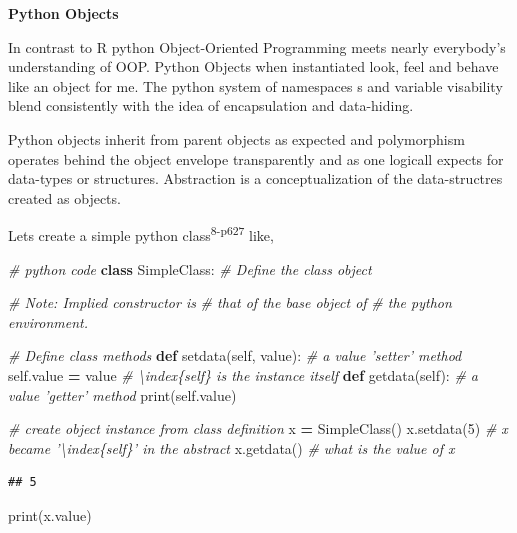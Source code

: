 \documentclass[]{book}
\newenvironment{Shaded}{\begin{snugshade}}{\end{snugshade}}
\newcommand{\KeywordTok}[1]{\textcolor[rgb]{0.13,0.29,0.53}{\textbf{#1}}}
\newcommand{\DecValTok}[1]{\textcolor[rgb]{0.00,0.00,0.81}{#1}}
\newcommand{\CommentTok}[1]{\textcolor[rgb]{0.56,0.35,0.01}{\textit{#1}}}
\newcommand{\VariableTok}[1]{\textcolor[rgb]{0.00,0.00,0.00}{#1}}
\newcommand{\OperatorTok}[1]{\textcolor[rgb]{0.81,0.36,0.00}{\textbf{#1}}}
\newcommand{\BuiltInTok}[1]{#1}
\newcommand{\NormalTok}[1]{#1}
\theoremstyle{definition}
\theoremstyle{definition}
\theoremstyle{definition}
\theoremstyle{remark}
\begin{document}
\textbf{Python Objects}

In contrast to R python Object-Oriented Programming meets nearly
everybody's understanding of OOP. Python Objects 
when instantiated look, feel and behave like an object for me. The
python system of namespaces s and variable visability
blend consistently with the idea of encapsulation and data-hiding.

Python objects inherit from parent objects as expected and polymorphism
operates behind the object envelope transparently and as one logicall
expects for data-types or structures. Abstraction is a conceptualization
of the data-structres created as objects.

Lets create a simple python class\textsuperscript{8-p627} like,

\begin{Shaded}
\begin{Highlighting}[]
\CommentTok{# python code}
\KeywordTok{class}\NormalTok{ SimpleClass:                 }
  \CommentTok{# Define the class object}
  
  \CommentTok{# Note: Implied constructor is  }
  \CommentTok{#    that of the base object of  }
  \CommentTok{#    the python environment.}
  
  \CommentTok{# Define class methods}
  \KeywordTok{def}\NormalTok{ setdata(}\VariableTok{self}\NormalTok{, value):       }\CommentTok{# a value 'setter' method}
    \VariableTok{self}\NormalTok{.value }\OperatorTok{=}\NormalTok{ value            }\CommentTok{#   \textbackslash{}index\{self\} is the instance itself}
  \KeywordTok{def}\NormalTok{ getdata(}\VariableTok{self}\NormalTok{):              }\CommentTok{# a value 'getter' method}
    \BuiltInTok{print}\NormalTok{(}\VariableTok{self}\NormalTok{.value)}
    
\CommentTok{# create object instance from class definition}
\NormalTok{x }\OperatorTok{=}\NormalTok{ SimpleClass()}
\NormalTok{x.setdata(}\DecValTok{5}\NormalTok{)                      }\CommentTok{# x became '\textbackslash{}index\{self\}' in the abstract}
\NormalTok{x.getdata()                       }\CommentTok{# what is the value of x}
\end{Highlighting}
\end{Shaded}

\begin{verbatim}
## 5
\end{verbatim}

\begin{Shaded}
\begin{Highlighting}[]
\BuiltInTok{print}\NormalTok{(x.value)}
\end{Highlighting}
\end{Shaded}
\end{document}
